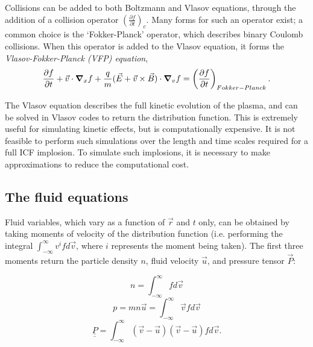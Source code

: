 Collisions can be added to both Boltzmann and Vlasov equations, through the addition of a collision operator $\left(\frac{\partial f}{\partial t}\right)_c$. Many forms for such an operator exist; a common choice is the `Fokker-Planck' operator, which describes binary Coulomb collisions. When this operator is added to the Vlasov equation, it forms the \textit{Vlasov-Fokker-Planck (VFP) equation},
\begin{equation} \frac{\partial f}{\partial t} + \vec{v}\cdot \grad_x f + \frac{q}{m}(\vec{E} + \vec{v}\times\vec{B}) \cdot \grad_v f = \left(\frac{\partial f}{\partial t}\right)_{Fokker-Planck}. \end{equation}

The Vlasov equation describes the full kinetic evolution of the plasma, and can be solved in Vlasov codes to return the distribution function. This is extremely useful for simulating kinetic effects, but is computationally expensive. It is not feasible to perform such simulations over the length and time scales required for a full ICF implosion. To simulate such implosions, it is necessary to make approximations to reduce the computational cost.

\subsection{The fluid equations}


Fluid variables, which vary as a function of $\vec{r}$ and $t$ only, can be obtained by taking moments of velocity of the distribution function (i.e. performing the integral $ \int^{\infty}_{-\infty} v^i f d\vec{v} $, where $i$ represents the moment being taken). The first three moments return the particle density $n$, fluid velocity $\vec{u}$, and pressure tensor $\vec{P}$:

\begin{equation} n = \int^{\infty}_{-\infty} f d\vec{v}  \end{equation}
\begin{equation} p = mn\vec{u} = \int^{\infty}_{-\infty} \vec{v} f d\vec{v} \end{equation}
\begin{equation} \underline{\underline{P}} = \int^{\infty}_{-\infty} (\vec{v} - \vec{u})(\vec{v} - \vec{u}) f d\vec{v}.  \end{equation}

